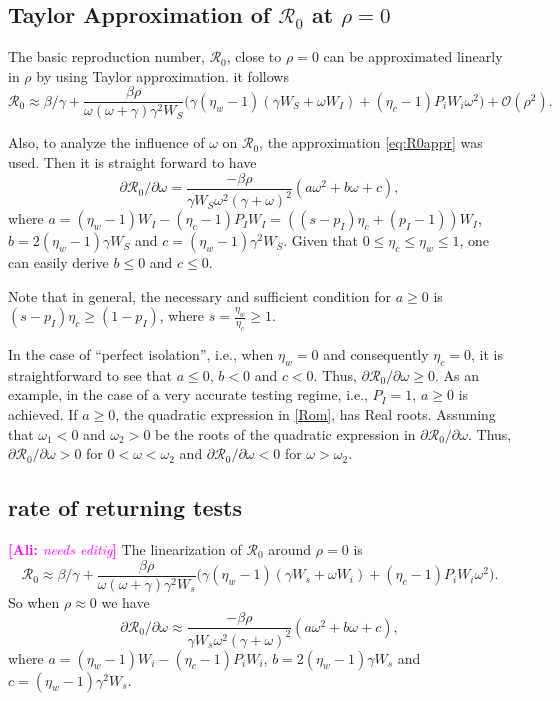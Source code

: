 \documentclass[12pt]{article}
\newcommand{\Rnum}{\mathcal{R}_0}
\newcommand{\comment}{\showcomment}
\newcommand{\showcomment}[3]{\textcolor{#1}{\textbf{[#2: }\textsl{#3}\textbf{]}}}
\newcommand{\ali}[1]{\comment{magenta}{Ali}{#1}}
\theoremstyle{definition} %
\begin{document}
\subsection{Taylor Approximation of $\Rnum$ at $\rho=0$ }
The basic reproduction number, $\Rnum$, close to $\rho=0$ can be approximated linearly in $\rho$ by using Taylor approximation. it follows
\begin{equation}
\label{eq:R0appr}
\Rnum \approx \beta/\gamma + \frac{\beta \rho}{\omega (\omega+\gamma) \gamma^2 W_S} \Big(\gamma(\eta_w-1)(\gamma W_S+\omega W_I) + (\eta_c -1)P_iW_i \omega^2 \Big) + \mathcal{O}(\rho^2).
\end{equation}

Also, to analyze the influence of $\omega$ on $\Rnum$, the approximation \eqref{eq:R0appr} was used. Then it is straight forward to have
\begin{equation}
\label{Rom}
\partial{\Rnum}/\partial{\omega}=  \frac{-\beta \rho}{\gamma W_S\omega^2 (\gamma+\omega)^2}  (a \omega^2 + b \omega + c),
\end{equation}
where $a=(\eta_w-1)W_I-(\eta_c-1)P_I W_I = ((s-p_I)\eta_c + (p_I-1)) W_I$, $b=2(\eta_w-1)\gamma W_S$ and $c=(\eta_w-1)\gamma^2 W_S$.
Given that $0 \leq \eta_c\leq \eta_w \leq 1 $, one can easily derive $b\leq 0$ and $c \leq 0$. 

Note that in general, the necessary and sufficient condition for $a \geq 0$ is $(s-p_I) \eta_c \geq (1-p_I)$, where $s=\frac{\eta_w}{\eta_c} \geq 1$. 

In the case of ``perfect isolation'', i.e., when $\eta_w=0$ and consequently $\eta_c=0$, it is straightforward to see that $a \leq 0$, $b<0$ and $c<0$. Thus, $\partial{\Rnum}/\partial{\omega} \geq 0$. 
As an example, in the case of a very accurate testing regime,  i.e., $P_I=1$, $a \geq 0$ is achieved. If $a\geq 0$, the quadratic expression in \eqref{Rom}, has Real roots. Assuming that $\omega_1<0$ and $\omega_2>0$ be the roots of the quadratic expression in $\partial{\Rnum}/\partial{\omega}$. Thus, $\partial{\Rnum}/\partial{\omega}>0$ for $0<\omega<\omega_2$ and  $\partial{\Rnum}/\partial{\omega}<0$ for $\omega>\omega_2$.

\subsection{rate of returning tests} 
\ali{needs editig}
The linearization of $\Rnum$ around $\rho=0$ is
\begin{equation}\label{linearization}
\Rnum \approx \beta/\gamma + \frac{\beta \rho}{\omega (\omega+\gamma) \gamma^2 W_s} \Big(\gamma(\eta_w-1)(\gamma W_s+\omega W_i) + (\eta_c -1)P_iW_i \omega^2 \Big). 
\end{equation}
So when $\rho \approx 0$ we have $$\partial{\Rnum}/\partial{\omega} \approx  \frac{-\beta \rho}{\gamma W_s\omega^2 (\gamma+\omega)^2}  (a \omega^2 + b \omega + c),$$
where $a=(\eta_w-1)W_i-(\eta_c-1)P_iW_i$, $b=2(\eta_w-1)\gamma W_s$ and $c=(\eta_w-1)\gamma^2 W_s$. 
\end{document}
